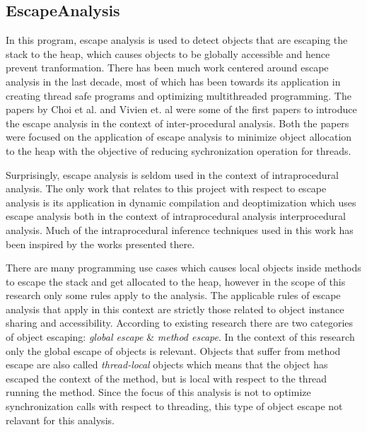 \subsection{EscapeAnalysis}\label{sec:escape}
In this program, escape analysis is used to detect objects that are escaping the stack to the heap, which causes objects to be globally accessible and hence prevent tranformation. There has been much work centered around escape analysis in the last decade, most of which has been towards its application in creating thread safe programs and optimizing multithreaded programming. The papers by Choi et al. and Vivien et. al \cite{ref:escapejava}\cite{ref:incrementalescape} were some of the first papers to introduce the escape analysis in the context of inter-procedural analysis. Both the papers were focused on the application of escape analysis to minimize object allocation to the heap with the objective of reducing sychronization operation for threads.

Surprisingly, escape analysis is seldom used in the context of intraprocedural analysis. The only work that relates to this project with respect to escape analysis is its application in dynamic compilation and deoptimization \cite{ref:globalescape} which uses escape analysis both in the context of intraprocedural analysis interprocedural analysis. Much of the intraprocedural inference techniques used in this work has been inspired by the works presented there.

There are many programming use cases which causes local objects inside methods to escape the stack and get allocated to the heap, however in the scope of this research only some rules apply to the analysis. The applicable rules of escape analysis that apply in this context are strictly those related to object instance sharing and accessibility. According to existing research \cite{ref:globalescape} there are two categories of object escaping: \textit{global escape} \& \textit{method escape}. In the context of this research only the global escape of objects is relevant. Objects that suffer from method escape are also called \textit{thread-local} objects which means that the object has escaped the context of the method, but is local with respect to the thread running the method. Since the focus of this analysis is not to optimize synchronization calls with respect to threading, this type of object escape not relavant for this analysis.

